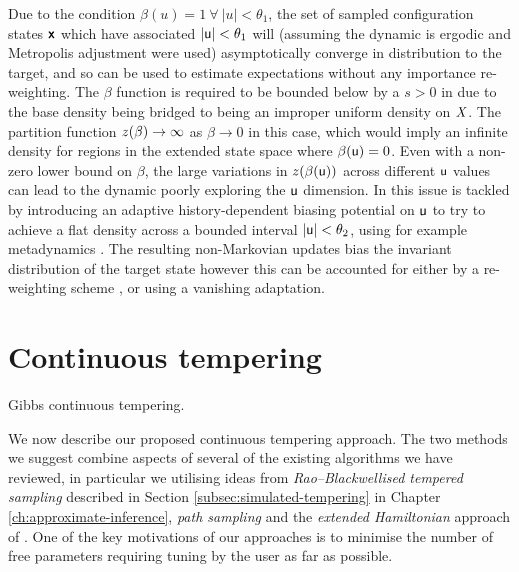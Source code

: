 Due to the condition $\beta(u) = 1 ~\forall~ |u| < \theta_1$, the set of sampled configuration states $\boldsymbol{\mathsf{x}}$ which have associated $|\mathsf{u}| < \theta_1$ will (assuming the dynamic is ergodic and Metropolis adjustment were used) asymptotically converge in distribution to the target, and so can be used to estimate expectations without any importance re-weighting. The $\beta$ function is required to be bounded below by a $s > 0$ in \citep{gobbo2015extended} due to the base density being bridged to being an improper uniform density on $\mathit{X}$. The partition function $z(\beta) \to \infty$ as $\beta \to  0$ in this case, which would imply an infinite density for regions in the extended state space where $\beta(\mathsf{u}) = 0$. Even with a non-zero lower bound on $\beta$, the large variations in $\partfunc\lpa\beta(\rvar{u})\rpa$  across different $\mathsf{u}$ values can lead to the dynamic poorly exploring the $\mathsf{u}$ dimension. In \citep{gobbo2015extended} this issue is tackled by introducing an adaptive history-dependent biasing potential on $\mathsf{u}$ to try to achieve a flat density across a bounded interval $|\mathsf{u}| < \theta_2$, using for example metadynamics \citep{laio2002escaping}. The resulting non-Markovian updates bias the invariant distribution of the target state however this can be accounted for either by a re-weighting scheme \citep{bonomi2009reconstructing}, or using a vanishing adaptation.

\section{Continuous tempering}\label{sec:proposed-approach}

\begin{algorithm}[t]
\caption{Gibbs continuous tempering.}
\label{alg:gibbs-continuous-tempering}

\end{algorithm}

We now describe our proposed continuous tempering approach. The two methods we suggest combine aspects of several of the existing algorithms we have reviewed, in particular we utilising ideas from \emph{Rao--Blackwellised tempered sampling} \citep{carlson2016partition} described in Section \ref{subsec:simulated-tempering} in Chap\-ter \ref{ch:approximate-inference}, \emph{path sampling} \citep{gelman1998simulating} and the \emph{extended Hamiltonian} approach of \citep{gobbo2015extended}. One of the key motivations of our approaches is to minimise the number of free parameters requiring tuning by the user as far as possible.

